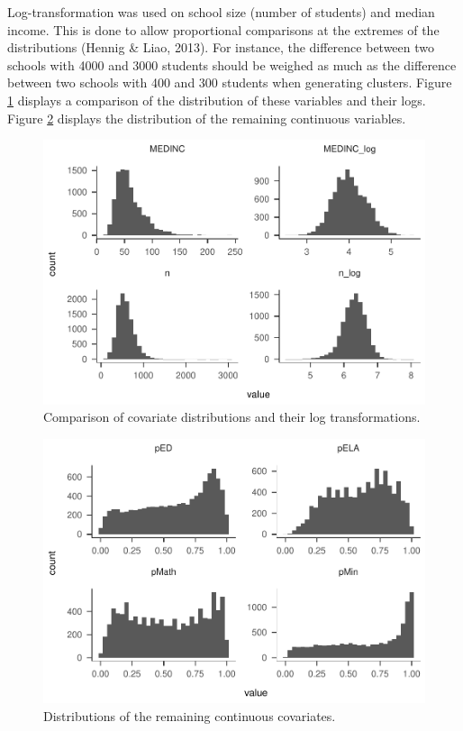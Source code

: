 \documentclass[man,floatsintext]{apa6}
\theoremstyle{definition}
\theoremstyle{definition}
\theoremstyle{definition}
\theoremstyle{remark}
\begin{document}
Log-transformation was used on school size (number of students) and
median income. This is done to allow proportional comparisons at the
extremes of the distributions (Hennig \& Liao, 2013). For instance, the
difference between two schools with 4000 and 3000 students should be
weighed as much as the difference between two schools with 400 and 300
students when generating clusters. Figure \ref{fig:plot-dist1} displays
a comparison of the distribution of these variables and their logs.
Figure \ref{fig:plot-dist2} displays the distribution of the remaining
continuous variables.

\begin{figure}
\centering
\includegraphics{GenSamp_Paper_files/figure-latex/plot-dist1-1.pdf}
\caption{\label{fig:plot-dist1}Comparison of covariate distributions and
their log transformations.}
\end{figure}

\begin{figure}
\centering
\includegraphics{GenSamp_Paper_files/figure-latex/plot-dist2-1.pdf}
\caption{\label{fig:plot-dist2}Distributions of the remaining continuous
covariates.}
\end{figure}
\end{document}

